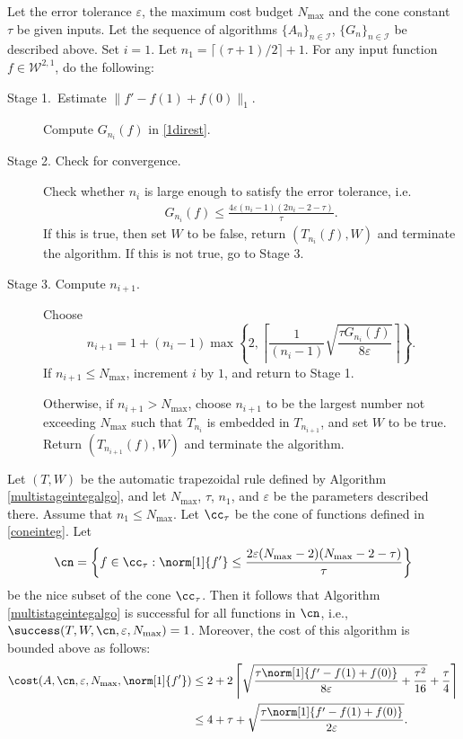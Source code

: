 \begin{algo} \label{multistageintegalgo}
Let the error tolerance $\varepsilon$, the maximum cost budget $N_{\text{max}}$ and the cone constant $\tau$ be given inputs. Let the sequence of algorithms $\{A_n\}_{n\in \mathcal{I}}$, $\{G_n\}_{n\in \mathcal{I}}$ be described above. Set $i=1$. Let $n_1=\lceil(\tau+1)/2\rceil+1$. For any input function $f\in \mathcal{W}^{2,1}$, do the following:
\begin{description}
\item[Stage 1.\ Estimate {$\|f'-f(1)+f(0)\|_{1}$}.] Compute $G_{n_i}(f)$ in \eqref{1direst}.

\item[Stage 2. Check for convergence.] Check whether $n_i$ is large enough to satisfy the error tolerance, i.e.
    \begin{align*}
     G_{n_i}(f) \le \frac{4\varepsilon(n_i-1)(2n_i-2 - \tau)}{\tau}.
    \end{align*}
    If this is true, then set $W$ to be false, return $(T_{n_i}(f),W)$ and terminate the algorithm. If this is not true, go to Stage 3.

\item[Stage 3. Compute $n_{i+1}$.] Choose
$$
n_{i+1}=1+ (n_i-1)\max\left\{2,\left\lceil\frac{1}{(n_i-1)}\sqrt{\frac{\tau G_{n_i}(f)}{8\varepsilon}}\right\rceil\right\}.
$$
If $n_{i+1} \le N_{\max}$, increment $i$ by $1$, and return to Stage 1.

Otherwise, if $n_{i+1} > N_{\max}$, choose $n_{i+1}$ to be the largest number not exceeding $N_{\max}$ such that $T_{n_{i}}$ is embedded in $T_{n_{i+1}}$, and set $W$ to be true. Return $(T_{n_{i+1}}(f),W)$ and terminate the algorithm.
\end{description}
\end{algo}

\begin{theorem} \label{multistageintegthm} Let $(T,W)$ be the automatic trapezoidal rule defined by Algorithm \ref{multistageintegalgo}, and let  $N_{\max}$, $\tau$, $n_1$, and $\varepsilon$ be the parameters described there.  Assume that $n_1 \le N_{\max}$.  Let $\cc_\tau$ be the cone of functions defined in \eqref{coneinteg}.  Let
$$
\cn
= \left \{ f \in \cc_\tau : \norm[1]{f'} \le \frac{2\varepsilon (N_{\max}-2)(N_{\max}-2 -\tau)}{\tau} \right\}
$$
be the nice subset of the cone $\cc_\tau$.  Then it follows that Algorithm \ref{multistageintegalgo} is successful for all functions in $\cn$,  i.e.,  $\success(T,W,\cn,\varepsilon,N_{\max}) = 1$.  Moreover, the cost of this algorithm is bounded above as follows:
\begin{align*}
\cost(A,\cn,\varepsilon,N_{\max},\norm[1]{f'})
&\le 2+2 \left \lceil \sqrt{\frac{\tau \norm[1]{f'-f(1)+f(0)}}{8\varepsilon} + \frac{\tau^2 }{16}} + \frac{\tau}{4} \right\rceil \\
&\le 4+ \tau + \sqrt{\frac{\tau \norm[1]{f'-f(1)+f(0)}}{2\varepsilon}}.
\end{align*}
\end{theorem}


